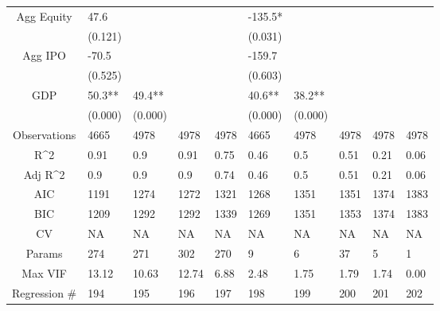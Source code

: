 \documentclass{article}
\begin{document}
\begin{table}[H]
\begin{tabular}{|clllllllll|}
  Agg Equity & 47.6 &  &  &  & -135.5* &  &  &  &  \\
   & (0.121) &  &  &  & (0.031) &  &  &  &  \\
  Agg IPO & -70.5 &  &  &  & -159.7 &  &  &  &  \\
   & (0.525) &  &  &  & (0.603) &  &  &  &  \\
  GDP & 50.3** & 49.4** &  &  & 40.6** & 38.2** &  &  &  \\
   & (0.000) & (0.000) &  &  & (0.000) & (0.000) &  &  &  \\
  \hline
 Observations & 4665 & 4978 & 4978 & 4978 & 4665 & 4978 & 4978 & 4978 & 4978 \\
  R^2 & 0.91 & 0.9 & 0.91 & 0.75 & 0.46 & 0.5 & 0.51 & 0.21 & 0.06 \\
  Adj R^2 & 0.9 & 0.9 & 0.9 & 0.74 & 0.46 & 0.5 & 0.51 & 0.21 & 0.06 \\
  AIC & 1191 & 1274 & 1272 & 1321 & 1268 & 1351 & 1351 & 1374 & 1383 \\
  BIC & 1209 & 1292 & 1292 & 1339 & 1269 & 1351 & 1353 & 1374 & 1383 \\
  CV & NA & NA & NA & NA & NA & NA & NA & NA & NA \\
  Params & 274 & 271 & 302 & 270 & 9 & 6 & 37 & 5 & 1 \\
  Max VIF & 13.12 & 10.63 & 12.74 & 6.88 & 2.48 & 1.75 & 1.79 & 1.74 & 0.00 \\
  Regression \# & 194 & 195 & 196 & 197 & 198 & 199 & 200 & 201 & 202 \\
   \hline
\end{tabular}

\end{table}
\end{document}
